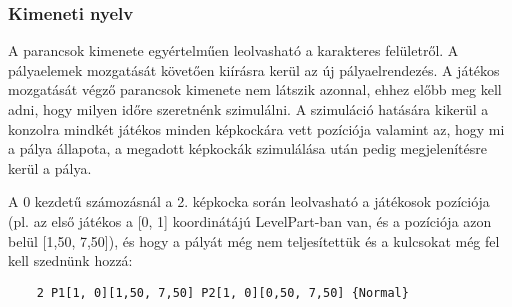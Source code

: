 \begin{usecase}
\end{usecase}

\begin{usecase}
\end{usecase}

\begin{usecase}
\end{usecase}

\subsubsection{Kimeneti nyelv}

A parancsok kimenete egyértelműen leolvasható a karakteres felületről. A pályaelemek mozgatását követően kiírásra kerül az új pályaelrendezés. A játékos mozgatását végző parancsok kimenete nem látszik azonnal, ehhez előbb meg kell adni, hogy milyen időre szeretnénk szimulálni. A szimuláció hatására kikerül a konzolra mindkét játékos minden képkockára vett pozíciója valamint az, hogy mi a pálya állapota, a megadott képkockák szimulálása után pedig megjelenítésre kerül a pálya.

\newpage

A 0 kezdetű számozásnál a 2. képkocka során leolvasható a játékosok pozíciója (pl. az első játékos a [0, 1] koordinátájú LevelPart-ban van, és a pozíciója azon belül [1,50, 7,50]), és hogy a pályát még nem teljesítettük és a kulcsokat még fel kell szednünk hozzá:
\begin{verbatim}
	2 P1[1, 0][1,50, 7,50] P2[1, 0][0,50, 7,50] {Normal}
\end{verbatim}

